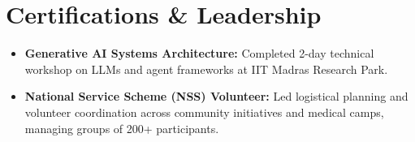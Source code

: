 \documentclass[letterpaper,10pt]{article}
\newcommand{\resumeItem}[1]{
  \item\small{
    {#1 \vspace{-2pt}}
  }
}
\newcommand{\resumeSubHeadingListStart}{\begin{itemize}[leftmargin=0.0in, label={}]}
\newcommand{\resumeSubHeadingListEnd}{\end{itemize}}
\newcommand{\resumeItemListStart}{\begin{itemize}[leftmargin=0.15in, label=\raisebox{0.15ex}{\tiny$\bullet$}, itemsep=1.5pt]}
\newcommand{\resumeItemListEnd}{\end{itemize}\vspace{-3pt}}
\begin{document}
\section{Certifications \& Leadership}
    \resumeSubHeadingListStart
        \resumeItemListStart
            \resumeItem{\textbf{Generative AI Systems Architecture:} Completed 2-day technical workshop on LLMs and agent frameworks at IIT Madras Research Park.}
            \resumeItem{\textbf{National Service Scheme (NSS) Volunteer:} Led logistical planning and volunteer coordination across community initiatives and medical camps, managing groups of 200+ participants.}
        \resumeItemListEnd
    \resumeSubHeadingListEnd
\end{document}
